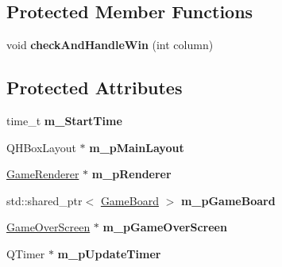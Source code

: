 \subsection*{Protected Member Functions}
\begin{DoxyCompactItemize}
\item 
\hypertarget{class_game_manager_a4d65975808a9ddce05814b0708b11268}{void {\bfseries check\-And\-Handle\-Win} (int column)}\label{class_game_manager_a4d65975808a9ddce05814b0708b11268}

\end{DoxyCompactItemize}
\subsection*{Protected Attributes}
\begin{DoxyCompactItemize}
\item 
\hypertarget{class_game_manager_aeb52618cdb82533c22690a269d7e2ab8}{time\-\_\-t {\bfseries m\-\_\-\-Start\-Time}}\label{class_game_manager_aeb52618cdb82533c22690a269d7e2ab8}

\item 
\hypertarget{class_game_manager_aee76ef2de914b2c0934c5b3264426edb}{Q\-H\-Box\-Layout $\ast$ {\bfseries m\-\_\-p\-Main\-Layout}}\label{class_game_manager_aee76ef2de914b2c0934c5b3264426edb}

\item 
\hypertarget{class_game_manager_af15f419d79f18cf1bfb846633fa60ea6}{\hyperlink{class_game_renderer}{Game\-Renderer} $\ast$ {\bfseries m\-\_\-p\-Renderer}}\label{class_game_manager_af15f419d79f18cf1bfb846633fa60ea6}

\item 
\hypertarget{class_game_manager_a9413c0906a485820589ea7c75d9f25b1}{std\-::shared\-\_\-ptr$<$ \hyperlink{class_game_board}{Game\-Board} $>$ {\bfseries m\-\_\-p\-Game\-Board}}\label{class_game_manager_a9413c0906a485820589ea7c75d9f25b1}

\item 
\hypertarget{class_game_manager_a8f611fd41149c74160bf1314d3c8ce09}{\hyperlink{class_game_over_screen}{Game\-Over\-Screen} $\ast$ {\bfseries m\-\_\-p\-Game\-Over\-Screen}}\label{class_game_manager_a8f611fd41149c74160bf1314d3c8ce09}

\item 
\hypertarget{class_game_manager_acc65f12646b0b5f041685066da3d5e7e}{Q\-Timer $\ast$ {\bfseries m\-\_\-p\-Update\-Timer}}\label{class_game_manager_acc65f12646b0b5f041685066da3d5e7e}


\end{DoxyCompactItemize}
